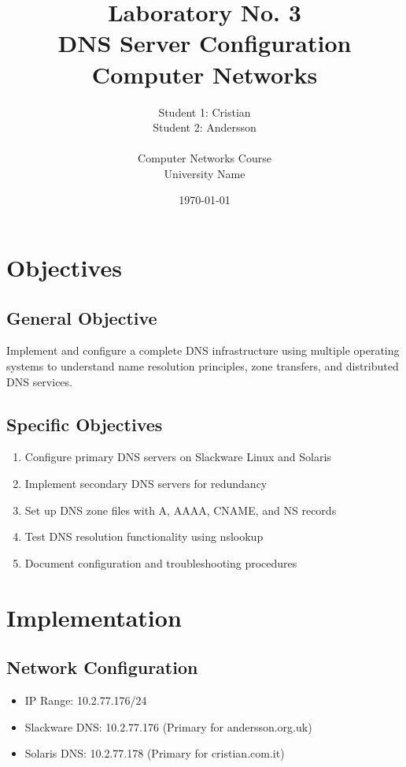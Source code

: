 \documentclass[12pt,a4paper]{article}
\title{\textbf{Laboratory No. 3}\\
\textbf{DNS Server Configuration}\\
\large Computer Networks}
\author{Student 1: Cristian\\
Student 2: Andersson\\
\\
Computer Networks Course\\
University Name}
\date{\today}
\begin{document}
\maketitle
\newpage

\tableofcontents
\newpage

\section{Objectives}

\subsection{General Objective}
Implement and configure a complete DNS infrastructure using multiple operating systems to understand name resolution principles, zone transfers, and distributed DNS services.

\subsection{Specific Objectives}
\begin{enumerate}
    \item Configure primary DNS servers on Slackware Linux and Solaris
    \item Implement secondary DNS servers for redundancy
    \item Set up DNS zone files with A, AAAA, CNAME, and NS records
    \item Test DNS resolution functionality using nslookup
    \item Document configuration and troubleshooting procedures
\end{enumerate}

\section{Implementation}

\subsection{Network Configuration}
\begin{itemize}
    \item IP Range: 10.2.77.176/24
    \item Slackware DNS: 10.2.77.176 (Primary for andersson.org.uk)
    \item Solaris DNS: 10.2.77.178 (Primary for cristian.com.it)
\end{itemize}
\end{document}
